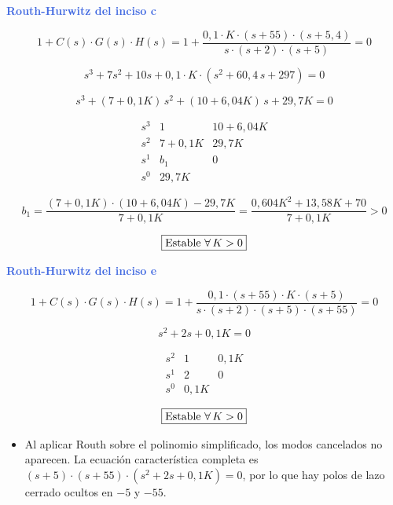\documentclass[10pt]{article}
\begin{document}
\vspace{0.4cm}

\hspace{0.2cm} \textbf{\textcolor{RoyalBlue}{Routh-Hurwitz del inciso c}}

\[
1 + C(s) \cdot G(s) \cdot H(s) = 1 + \frac{0{,}1 \cdot K \cdot (s + 55) \cdot (s + 5{,}4)}{s \cdot (s + 2) \cdot (s + 5)} = 0
\]

\[
s^3 + 7s^2 + 10s + 0{,}1 \cdot K \cdot (s^2 + 60{,}4\,s + 297) = 0
\]

\[
s^3 + (7 + 0{,}1K) \, s^2 + (10 + 6{,}04K) \, s + 29{,}7K = 0
\]

\[
\begin{array}{c|cc}
s^3 & 1 & 10 + 6{,}04K \\
s^2 & 7 + 0{,}1K & 29{,}7K \\
s^1 & b_1 & 0 \\
s^0 & 29{,}7K &
\end{array}
\]

\[
b_1 = \frac{(7 + 0{,}1K) \cdot (10 + 6{,}04K) - 29{,}7K}{7 + 0{,}1K} = \frac{0{,}604K^2 + 13{,}58K + 70}{7 + 0{,}1K} > 0
\]

\[
\fbox{Estable $\forall \, K > 0$}
\]

\hspace{0.2cm} \textbf{\textcolor{RoyalBlue}{Routh-Hurwitz del inciso e}}

\[
1 + C(s) \cdot G(s) \cdot H(s) = 1 + \frac{0{,}1 \cdot (s + 55) \cdot K \cdot (s + 5)}{s \cdot (s + 2) \cdot (s + 5) \cdot (s + 55)} = 0
\]

\[
s^2 + 2s + 0{,}1K = 0
\]

\[
\begin{array}{c|cc}
s^2 & 1 & 0{,}1K \\
s^1 & 2 & 0 \\
s^0 & 0{,}1K &
\end{array}
\]

\[
\fbox{Estable $\forall \, K > 0$}
\]

\begin{itemize}
    \item Al aplicar Routh sobre el polinomio simplificado, los modos cancelados no aparecen. La ecuación característica completa es $(s + 5) \cdot (s + 55) \cdot (s^2 + 2s + 0{,}1K) = 0$, por lo que hay polos de lazo cerrado ocultos en $-5$ y $-55$.
\end{itemize}
\end{document}
